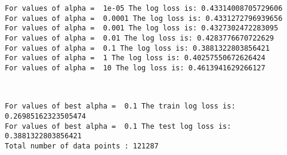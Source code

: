 \documentclass[11pt]{article}
\begin{document}
    \begin{Verbatim}[commandchars=\\\{\}]
For values of alpha =  1e-05 The log loss is: 0.43314008705729606
For values of alpha =  0.0001 The log loss is: 0.4331272796939656
For values of alpha =  0.001 The log loss is: 0.4327302472283095
For values of alpha =  0.01 The log loss is: 0.4283776670722629
For values of alpha =  0.1 The log loss is: 0.3881322803856421
For values of alpha =  1 The log loss is: 0.40257550672626424
For values of alpha =  10 The log loss is: 0.4613941629266127

    \end{Verbatim}

    \begin{center}
    \end{center}
    { \hspace*{\fill} \\}
    
    \begin{Verbatim}[commandchars=\\\{\}]
For values of best alpha =  0.1 The train log loss is: 0.26985162323505474
For values of best alpha =  0.1 The test log loss is: 0.3881322803856421
Total number of data points : 121287

    \end{Verbatim}

    \begin{center}
    \end{center}
    { \hspace*{\fill} \\}
    
\end{document}
